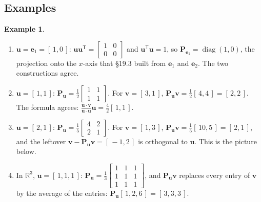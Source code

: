 \documentclass[11pt]{article}
\theoremstyle{plain}
\theoremstyle{definition}
\newtheorem{ex}{Example}[section]
\theoremstyle{remark}
\newcommand{\R}{\mathbb{R}}
\newcommand{\vc}[1]{\mathbf{#1}}
\newcommand{\mt}[1]{\mathbf{#1}}
\newcommand{\T}{^{\mathsf{T}}}
\DeclareMathOperator{\diagop}{diag}
\begin{document}
\subsection{Examples}
\begin{ex}
\label{ex:proj}
\leavevmode
\begin{enumerate}[label=(\alph*),leftmargin=2em,itemsep=4pt]
  \item $\vc{u}=\vc{e}_1=[\,1,0\,]$: $\vc{u}\vc{u}\T=\begin{bmatrix}1&0\\0&0\end{bmatrix}$
        and $\vc{u}\T\vc{u}=1$, so $\mt{P}_{\vc{e}_1}=\diagop(1,0)$, the projection
        onto the $x$-axis that \S19.3 built from $\vc{e}_1$ and $\vc{e}_2$.
        The two constructions agree.
  \item $\vc{u}=[\,1,1\,]$: $\mt{P}_{\vc{u}}=\frac12\begin{bmatrix}1&1\\1&1\end{bmatrix}$.
        For $\vc{v}=[\,3,1\,]$, $\mt{P}_{\vc{u}}\vc{v}=\frac12[\,4,4\,]=[\,2,2\,]$.
        The formula agrees: $\frac{\vc{u}\cdot\vc{v}}{\vc{u}\cdot\vc{u}}\vc{u}=\frac42[\,1,1\,]$.
  \item $\vc{u}=[\,2,1\,]$: $\mt{P}_{\vc{u}}=\frac15\begin{bmatrix}4&2\\2&1\end{bmatrix}$.
        For $\vc{v}=[\,1,3\,]$, $\mt{P}_{\vc{u}}\vc{v}=\frac15[\,10,5\,]=[\,2,1\,]$,
        and the leftover $\vc{v}-\mt{P}_{\vc{u}}\vc{v}=[\,-1,2\,]$ is orthogonal to
        $\vc{u}$. This is the picture below.
  \item In $\R^{3}$, $\vc{u}=[\,1,1,1\,]$:
        $\mt{P}_{\vc{u}}=\frac13\begin{bmatrix}1&1&1\\1&1&1\\1&1&1\end{bmatrix}$,
        and $\mt{P}_{\vc{u}}\vc{v}$ replaces every entry of $\vc{v}$ by the average
        of the entries: $\mt{P}_{\vc{u}}[\,1,2,6\,]=[\,3,3,3\,]$.
\end{enumerate}
\end{ex}
\end{document}
